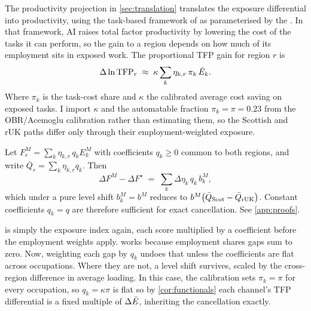 The productivity projection in \cref{sec:translation} translates the exposure differential into productivity, using the task-based framework of \citet{acemoglu2025} as parameterised by the \citet{obr2025}. In that framework, AI raises total factor productivity by lowering the cost of the tasks it can perform, so the gain to a region depends on how much of its employment sits in exposed work. The proportional TFP gain for region $r$ is
\begin{equation}\label{eq:tfp}
\Delta \ln \mathrm{TFP}_r \;\approx\;
\kappa \sum_k \eta_{k,r}\, \pi_k\, \bar{E}_k .
\end{equation}
Where $\pi_k$ is the task-cost share and $\kappa$ the calibrated average cost saving on exposed tasks. 
I import $\kappa$ and the automatable fraction $\pi_k = \pi = 0.23$ from the OBR/Acemoglu calibration rather than estimating them, so the Scottish and rUK paths differ only through their employment-weighted exposure. 

\begin{corollary}\label{cor:functionals}
Let $F^{M}_r = \sum_k \eta_{k,r}\, q_k E^{M}_k$ with coefficients $q_k \ge 0$ common
to both regions, and write $\bar{Q}_r = \sum_k \eta_{k,r} q_k$. Then
\begin{equation}\label{eq:cor3}
\Delta F^{M} - \Delta F^{\star} \;=\; \sum_k \Delta\eta_k\, q_k\, b^{M}_k ,
\end{equation}
which under a pure level shift $b^{M}_k = b^{M}$ reduces to
$b^{M}\bigl(\bar{Q}_{\mathrm{Scot}} - \bar{Q}_{\mathrm{rUK}}\bigr)$. Constant coefficients
$q_k = q$ are therefore sufficient for exact cancellation. See \cref{app:proofs}.
\end{corollary}

\noindent
{} is simply the exposure index again, each score multiplied by a coefficient before the employment weights apply.  works because employment shares gaps sum to zero. Now, weighting each gap by $q_k$ undoes that unless the coefficients are flat across occupations. Where they are not, a level shift survives, scaled by the cross-region difference in average loading. In this case, the calibration sets $\pi_k = \pi$ for every occupation, so $q_k = \kappa\pi$ is flat so by \cref{cor:functionals} each channel's TFP differential is a fixed multiple of $\Delta\bar{E}$, inheriting the cancellation exactly. 

